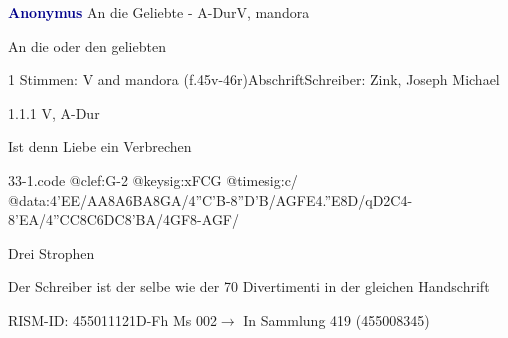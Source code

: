 \documentclass[twocolumn, 12pt]{book}
\begin{document}
\par \vspace{16pt} \textcolor{darkblue}{\textbf{Anonymus  }}\hfillplus{\textbf{[33]}}\newline An die Geliebte - A-Dur\newline V, mandora
\par \begin{itshape}[heading, f.45v:] An die oder den geliebten\end{itshape} 
\par \textcolor{darkblue}{}  1 Stimmen: V and mandora  (f.45v-46r)\newline Abschrift\newline Schreiber: Zink, Joseph Michael
\par 1.1.1  V, A-Dur\newline \begin{footnotesize} Ist denn Liebe ein Verbrechen \end{footnotesize}  
\begin{filecontents*}{33-1.code}
@clef:G-2
@keysig:xFCG
@timesig:c/
@data:4'EE/AA{8A6BA}8GA/4''C'B-8''D'B/{AG}{FE}4.''E8D/qD2C4-8'EA/4''CC{8C6DC}8'BA/4GF8-AGF/
\end{filecontents*}
\newline %
\par Drei Strophen
\par Der Schreiber ist der selbe wie der 70 Divertimenti in der gleichen Handschrift
\par RISM-ID: 455011121\newline D-Fh  Ms 002\newline $\rightarrow$ In Sammlung 419 (455008345)
      
\end{document}
